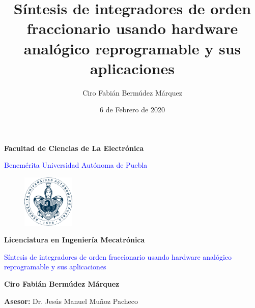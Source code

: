 \documentclass[10pt]{beamer}
\author{Ciro Fabián Bermúdez Márquez}
\title{Síntesis de integradores de orden fraccionario usando hardware analógico reprogramable y sus aplicaciones}
\institute{Benemérita Universidad Autónoma de Puebla} \date{6 de Febrero de 2020}
\begin{document}
	\begin{frame}[plain]
	
		\begin{center}
			\textbf{Facultad de Ciencias de La Electrónica}
		\end{center}
		
		\begin{center}
			\textcolor{blue}{Benemérita Universidad Autónoma de Puebla}
		\end{center}
		
		\begin{figure}[hbtp]
			\centering
			\includegraphics[width = 2.5cm]{logobuap.png} 
		\end{figure}
		
		\begin{center}
			\textbf{Licenciatura en Ingeniería Mecatrónica}
		\end{center}
						
		\begin{center}
			\begin{Large}
			\textcolor{blue}{Síntesis de integradores de orden fraccionario usando hardware analógico reprogramable y sus aplicaciones}
			\end{Large}
		\end{center}
		
		\begin{center}
			\textbf{Ciro Fabián Bermúdez Márquez }
		\end{center}
		
		\begin{center}
			\textbf{Asesor:} Dr. Jesús Manuel Muñoz Pacheco
		\end{center}
		
	
		
	\end{frame}
	
	\begin{frame}
		\tableofcontents
	\end{frame}

\end{document}
